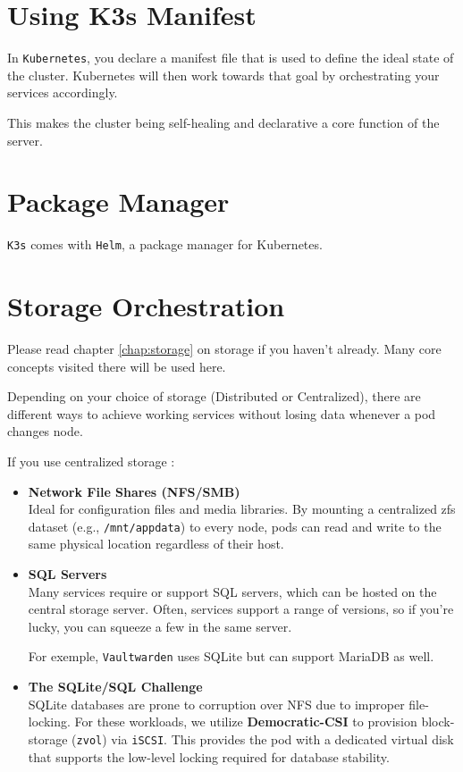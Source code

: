 \section{Using K3s Manifest}
In \texttt{Kubernetes}, you declare a manifest file that is used to define the ideal state of the cluster. Kubernetes will then work towards that goal by orchestrating your services accordingly.

This makes the cluster being self-healing and declarative a core function of the server.

\section{Package Manager}
\texttt{K3s} comes with \texttt{Helm}, a package manager for Kubernetes.

\section{Storage Orchestration}\label{section:pod-storage}
Please read chapter \ref{chap:storage} on storage if you haven't already. Many core concepts visited there will be used here.

Depending on your choice of storage (Distributed or Centralized), there are different ways to achieve working services without losing data whenever a pod changes node.

If you use centralized storage :
\begin{itemize}
	\item \textbf{Network File Shares (NFS/SMB)} \\
	Ideal for configuration files and media libraries. 
	By mounting a centralized \gls{zfs} dataset (e.g., \texttt{/mnt/appdata}) to every node, pods can read and write to the same physical location regardless of their host.
	
	\item \textbf{SQL Servers} \\
	Many services require or support SQL servers, which can be hosted on the central storage server. Often, services support a range of versions, so if you're lucky, you can squeeze a few in the same server. 
	
	For exemple, \texttt{Vaultwarden} uses SQLite but can support MariaDB as well. 
	
	\item \textbf{The SQLite/SQL Challenge} \\
	SQLite databases are prone to corruption over NFS due to improper file-locking.
	For these workloads, we utilize \textbf{Democratic-CSI} to provision block-storage (\texttt{zvol}) via \texttt{iSCSI}. 
	This provides the pod with a dedicated virtual disk that supports the low-level locking required for database stability.
\end{itemize}



